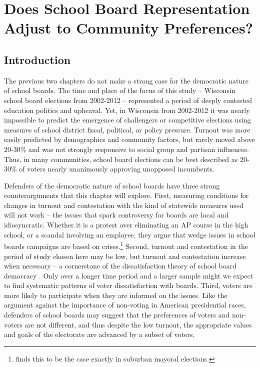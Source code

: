 \chapter{Does School Board Representation Adjust to Community Preferences?}
\label{chap:walker}




\section{Introduction}

The previous two chapters do not make a strong case for the democratic nature 
of school boards. The time and place of the focus of this study -- Wisconsin 
school board elections from 2002-2012 -- represented a period of deeply contested 
education politics and upheaval. Yet, in Wisconsin from 2002-2012 it was 
nearly impossible to predict the emergence of challengers or competitive 
elections using measures of school district fiscal, political, or policy 
pressure. Turnout was more easily predicted by demographics and community factors, 
but rarely moved above 20-30\% and was not strongly responsive to social group 
and partisan influences. Thus, in many communities, school board elections can 
be best described as 20-30\% of voters nearly unanimously approving unopposed 
incumbents. 

Defenders of the democratic nature of school boards have three strong counterarguments 
that this chapter will explore. First, measuring conditions for changes in 
turnout and contestation with the kind of statewide measures used will not work 
-- the issues that spark controversy for boards are local and idiosyncratic. Whether 
it is a protest over eliminating an AP course in the high school, or a scandal
involving an employee, they argue that wedge issues in school boards campaigns are based on 
crises.\footnote{\citet{oliver} finds this to be the case exactly in suburban 
mayoral elections.} %
Second, turnout and contestation in the period of study chosen here may be low, but 
turnout and contestation increase when necessary -- a cornerstone of the 
dissatisfaction theory of school board democracy \citep{RefWorks:297}. Only 
over a longer time period and a larger 
sample might we expect to find systematic patterns of voter dissatisfaction with 
boards. Third, voters are more likely to participate when they are informed on 
the issues. Like the argument against the importance of non-voting in American
presidential races, defenders of school boards may suggest that the preferences 
of voters and non-voters are not different, and thus despite the low turnout, 
the appropriate values and goals of the electorate are advanced by a subset of voters. 

